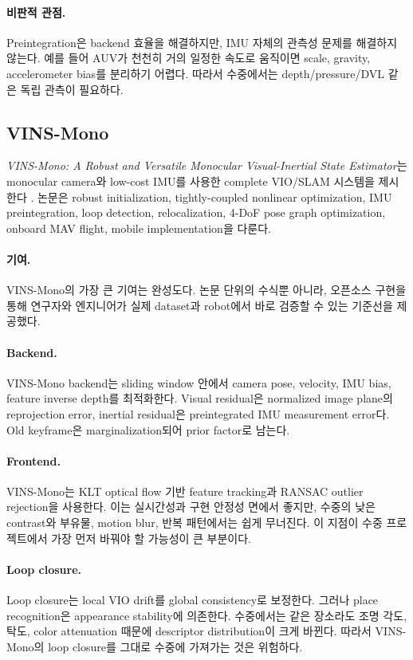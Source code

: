 \documentclass[11pt,a4paper]{article}
\newcommand{\paper}[1]{\textit{#1}}
\begin{document}
\paragraph{비판적 관점.}
Preintegration은 backend 효율을 해결하지만, IMU 자체의 관측성 문제를 해결하지 않는다.
예를 들어 AUV가 천천히 거의 일정한 속도로 움직이면 scale, gravity, accelerometer bias를 분리하기 어렵다.
따라서 수중에서는 depth/pressure/DVL 같은 독립 관측이 필요하다.

\subsection{VINS-Mono}

\paper{VINS-Mono: A Robust and Versatile Monocular Visual-Inertial State Estimator}는 monocular camera와 low-cost IMU를 사용한 complete VIO/SLAM 시스템을 제시한다 \cite{qin2018vinsmono}.
논문은 robust initialization, tightly-coupled nonlinear optimization, IMU preintegration, loop detection, relocalization, 4-DoF pose graph optimization, onboard MAV flight, mobile implementation을 다룬다.

\paragraph{기여.}
VINS-Mono의 가장 큰 기여는 완성도다.
논문 단위의 수식뿐 아니라, 오픈소스 구현을 통해 연구자와 엔지니어가 실제 dataset과 robot에서 바로 검증할 수 있는 기준선을 제공했다.

\paragraph{Backend.}
VINS-Mono backend는 sliding window 안에서 camera pose, velocity, IMU bias, feature inverse depth를 최적화한다.
Visual residual은 normalized image plane의 reprojection error, inertial residual은 preintegrated IMU measurement error다.
Old keyframe은 marginalization되어 prior factor로 남는다.

\paragraph{Frontend.}
VINS-Mono는 KLT optical flow 기반 feature tracking과 RANSAC outlier rejection을 사용한다.
이는 실시간성과 구현 안정성 면에서 좋지만, 수중의 낮은 contrast와 부유물, motion blur, 반복 패턴에서는 쉽게 무너진다.
이 지점이 수중 프로젝트에서 가장 먼저 바꿔야 할 가능성이 큰 부분이다.

\paragraph{Loop closure.}
Loop closure는 local VIO drift를 global consistency로 보정한다.
그러나 place recognition은 appearance stability에 의존한다.
수중에서는 같은 장소라도 조명 각도, 탁도, color attenuation 때문에 descriptor distribution이 크게 바뀐다.
따라서 VINS-Mono의 loop closure를 그대로 수중에 가져가는 것은 위험하다.
\end{document}
